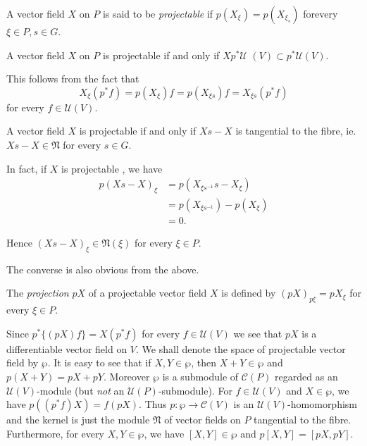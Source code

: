 \begin{defn}\label{chap2:sec9:def7}%
  A vector field $X$ on $P$ is said to be {\em projectable} if $p
  (X_\xi) = p (X_{\xi_s})$ for\pageoriginale every $\xi \in P, s \in G$.  
\end{defn}

\begin{proposition}\label{chap2:sec9:prop5}%
  A vector field $X$ on $P$ is projectable if and only if $X p^*
  \mathscr{U}$ $(V) \subset p^* \mathscr{U} (V)$.  
\end{proposition}

This follows from the fact that 
$$
X_\xi (p^* f)= p(X_\xi) f = p(X_{\xi s}) f = X_{\xi s} (p^* f)
$$
 for every $f \in \mathscr{U}(V)$. 

\begin{proposition}\label{chap2:sec9:prop6} %
  A vector field $X$ is projectable if and only if $Xs- X$ is
  tangential to the fibre, ie. $Xs - X \in \mathfrak{N}$ for every $s
  \in G$.  
\end{proposition} 
 
In fact, if $X$ is projectable , we have 
\begin{align*}
  p (Xs - X)_\xi & = p ( X _{ \xi s^{-1}} s - X_\xi )\\
  & = p (X_{\xi s^{-1}}) - p (X_\xi )\\
  & = 0. 
 \end{align*} 
 
Hence $(X s - X )_\xi \in \mathfrak{N} (\xi)$ for every $\xi \in P$. 
 
The converse is also obvious from the above. 

\begin{defn}\label{chap2:sec9:def8} %
  The {\em projection} $pX$ of a projectable vector field $X$ is
  defined by $(pX)_{p\xi} = p X_\xi$ for every $\xi \in P$.  
\end{defn}  
 
 Since $p^* \{ (pX )f \}  = X (p^* f)$ for every $f \in \mathscr{U}
 (V)$ we see that $p X$ is a differentiable vector field on $V$. We
 shall denote the space of projectable vector field by $\wp$. It is
 easy to see that if $X, Y \in \wp$, then $X + Y \in \wp$ and $p (X
 +Y) = pX + pY$. Moreover $\wp$ is a submodule of $\mathscr{C}(P )$
 regarded as an $\mathscr{U}(V)$-module (but \textit{not} an $
 \mathscr{U}(P)$-submodule). For $f \in \mathscr{U} (V)$ and
 $X \in \wp$, we have $p ((p^*f)X) = f (pX)$. Thus $p : \wp \to
 \mathscr{C}(V)$ is an $\mathscr{U}(V)$-homomorphism and the kernel is
 just the module $\mathfrak{N}$ of vector fields on $P$ tangential to
 the fibre. Furthermore, for every $X, Y \in \wp$, we have $[X , Y]
 \in \wp$ and $p [ X, Y] = [pX, pY]$.  

